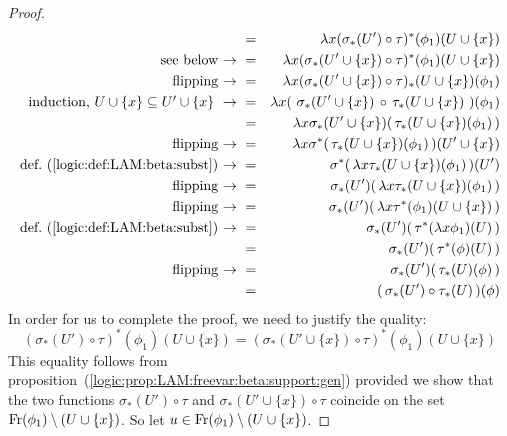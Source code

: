 \begin{proof}
\begin{eqnarray*}
            &=&\lambda x(\sigma_{*}(U')\circ\tau)^{*}(\phi_{1})(U\cup\{x\})\\
            \mbox{see below\ $\to$\ }
            &=&\lambda x(\sigma_{*}(U'\cup\{x\})\circ
                         \tau)^{*}(\phi_{1})(U\cup\{x\})\\
            \mbox{flipping\ $\to$\ }
            &=&\lambda x(\sigma_{*}(U'\cup\{x\})\circ
                         \tau)_{*}(U\cup\{x\})(\phi_{1})\\
            \mbox{induction, $U\cup\{x\}\subseteq U'\cup\{x\}\ \to\ $}
            &=&\lambda x(\ \sigma_{*}(U'\cup\{x\})\,\circ\,
                           \tau_{*}(U\cup\{x\})\ )(\phi_{1})\\
            &=&\lambda x \sigma_{*}(U'\cup\{x\})(\,
                         \tau_{*}(U\cup\{x\})(\phi_{1})\,)\\
            \mbox{flipping\ $\to$\ }
            &=&\lambda x \sigma^{*}(\,\tau_{*}(U\cup\{x\})(\phi_{1})\,)
                         (U'\cup\{x\})\\
            \mbox{def.~(\ref{logic:def:LAM:beta:subst})\ $\to$\ }
            &=&\sigma^{*}(\,\lambda x\tau_{*}(U\cup\{x\})(\phi_{1})\,)(U')\\
            \mbox{flipping\ $\to$\ }
            &=&\sigma_{*}(U')(\,\lambda x\tau_{*}(U\cup\{x\})(\phi_{1})\,)\\
            \mbox{flipping\ $\to$\ }
            &=&\sigma_{*}(U')(\,\lambda x\tau^{*}(\phi_{1})(U\cup\{x\})\,)\\
            \mbox{def.~(\ref{logic:def:LAM:beta:subst})\ $\to$\ }
            &=&\sigma_{*}(U')(\,\tau^{*}(\lambda x\phi_{1})(U)\,)\\
            &=&\sigma_{*}(U')(\,\tau^{*}(\phi)(U)\,)\\
            \mbox{flipping\ $\to$\ }
            &=&\sigma_{*}(U')(\,\tau_{*}(U)(\phi)\,)\\
            &=&(\,\sigma_{*}(U')\circ\tau_{*}(U)\,)(\phi)
        \end{eqnarray*}
    In order for us to complete the proof, we need to justify the quality:
        \[
            (\sigma_{*}(U')\circ\tau)^{*}(\phi_{1})(U\cup\{x\})
            =
            (\sigma_{*}(U'\cup\{x\})\circ\tau)^{*}(\phi_{1})(U\cup\{x\})
        \]
    This equality follows from 
    proposition~(\ref{logic:prop:LAM:freevar:beta:support:gen}) provided
    we show that the two functions $\sigma_{*}(U')\circ\tau$ and
    $\sigma_{*}(U'\cup\{x\})\circ\tau$ coincide on the set $\mbox{\rm Fr}(\phi_{1})
    \setminus(U\cup\{x\})$. So let $u\in\mbox{\rm Fr}(\phi_{1})\setminus(U\cup\{x\})$.

\end{proof}
